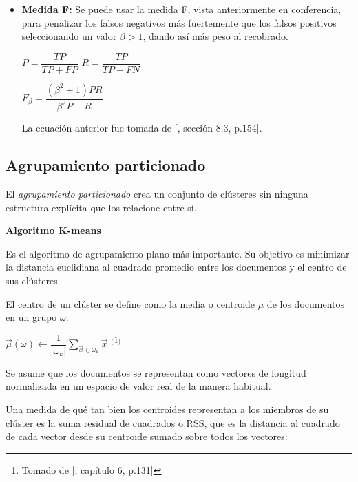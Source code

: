 \documentclass{llncs}
\begin{document}
\begin{itemize}
	\vspace{1em}
	\item \textbf{Medida F:} Se puede usar la medida F, vista anteriormente en conferencia, para penalizar los falsos negativos más fuertemente que los falsos positivos seleccionando un valor $ \beta > 1 $, dando así más peso al recobrado.
	\begin{center}
		$ P = \dfrac{TP}{TP + FP}  $ \hspace{2em}
		$ R = \dfrac{TP}{TP + FN} $
		
		\vspace{1em}
		$ F_{\beta} = \dfrac{(\beta^{2} + 1)PR}{\beta^{2}P + R} $
	\end{center}
	La ecuaci\'on anterior fue tomada de [\cite{B1}, secci\'on 8.3, p.154].
\end{itemize}

\subsection{Agrupamiento particionado}

El \textit{agrupamiento particionado} crea un conjunto  de clústeres sin ninguna estructura explícita que los relacione entre sí. 

\vspace{1em}
\textbf{Algoritmo K-means}
\vspace{0.5em}

	Es el algoritmo de agrupamiento plano más importante. Su objetivo es minimizar la distancia euclidiana al cuadrado promedio entre los documentos y el centro de sus cl\'usteres. 
	
	El centro de un cl\'uster se define como la media o centroide $\mu$ de los documentos en un grupo $\omega$:
	
	\begin{center}
		$ \overrightarrow{\mu}(\omega) \leftarrow \dfrac{1}{|\omega_{k}|} \sum_{\overrightarrow{x} \in \omega_{k}} \overrightarrow{x} $ $ ^{(} $\footnote{\scriptsize{Tomado de [\cite{B1}, cap\'itulo 6, p.131]}}$ ^{)} $
	\end{center}
	
	Se asume que los documentos se representan como vectores de longitud normalizada  en un espacio de valor real de la manera habitual.  
	
	Una medida de qué tan bien los centroides representan a los miembros de su cl\'uster es la suma residual de cuadrados o RSS, que es la distancia al cuadrado de cada vector desde su centroide sumado sobre todos los vectores:
	
\end{document}
